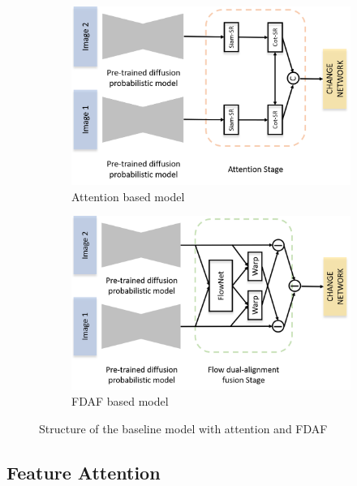 \documentclass{article}
\begin{document}
\begin{figure}[h]
  \centering
  \begin{subfigure}[b]{0.4\linewidth}
      \includegraphics[width=\linewidth]{baseline_with_attention.png}
      \caption{Attention based model}
      \label{fig:baseline_with_attention}
  \end{subfigure}
  \begin{subfigure}[b]{0.4\linewidth}
      \includegraphics[width=\linewidth]{baseline_with_fdaf.png}
      \caption{FDAF based model}
      \label{fig:baseline_with_fdaf}
  \end{subfigure}
  \caption{Structure of the baseline model with attention and FDAF}
  \label{fig:baseline_with_attention_and_fdaf}
\end{figure}

\subsection{Feature Attention}
\end{document}
